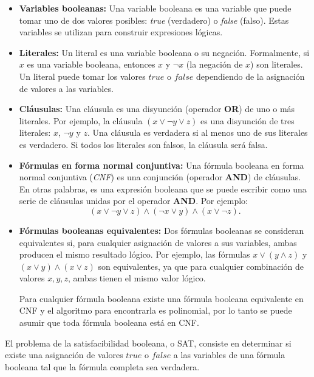 \documentclass[12pt]{article}
\begin{document}
\begin{itemize}
  \item \textbf{Variables booleanas:}
        Una variable booleana es una variable que puede tomar uno de dos valores posibles: \textit{true} (verdadero) o \textit{false} (falso). Estas variables se utilizan para construir expresiones lógicas.
  \item \textbf{Literales:}
        Un literal es una variable booleana o su negación. Formalmente, si \( x \) es una variable booleana, entonces \( x \) y \( \neg x \) (la negación de \( x \)) son literales. Un literal puede tomar los valores \( true \) o \( false \) dependiendo de la asignación de valores a las variables.
  \item  \textbf{Cláusulas:}
        Una cláusula es una disyunción (operador \textbf{OR}) de uno o más literales. Por ejemplo, la cláusula \( (x \vee \neg y \vee z) \) es una disyunción de tres literales: \( x \), \( \neg y \) y \( z \). Una cláusula es verdadera si al menos uno de sus literales es verdadero. Si todos los literales son falsos, la cláusula será falsa.
  \item \textbf{Fórmulas en forma normal conjuntiva:}
        Una fórmula booleana en forma normal conjuntiva (\textit{CNF}) es una conjunción (operador \textbf{AND}) de cláusulas. En otras palabras, es una expresión booleana que se puede escribir como una serie de cláusulas unidas por el operador \textbf{AND}. Por ejemplo:        
        \[
          (x \vee \neg y \vee z) \wedge (\neg x \vee y) \wedge (x \vee \neg z).
        \]
  \item \textbf{Fórmulas booleanas equivalentes:}
        Dos fórmulas booleanas se consideran equivalentes si, para cualquier asignación de valores a sus variables, ambas producen el mismo resultado lógico. Por ejemplo, las fórmulas \( x \vee (y \wedge z) \) y \( (x \vee y) \wedge (x \vee z) \) son equivalentes, ya que para cualquier combinación de valores \( x, y, z \), ambas tienen el mismo valor lógico.
        
        Para cualquier fórmula booleana existe una fórmula booleana equivalente en CNF \cite{authomataTheory} y 
        el algoritmo para encontrarla es polinomial, por lo tanto se puede asumir que toda fórmula booleana está en CNF.
        
\end{itemize}

El problema de la satisfacibilidad booleana, o SAT, consiste en determinar si existe una asignación de valores \( true \) o \( false \) a las variables de una fórmula booleana tal que la fórmula completa sea verdadera. 
\end{document}
